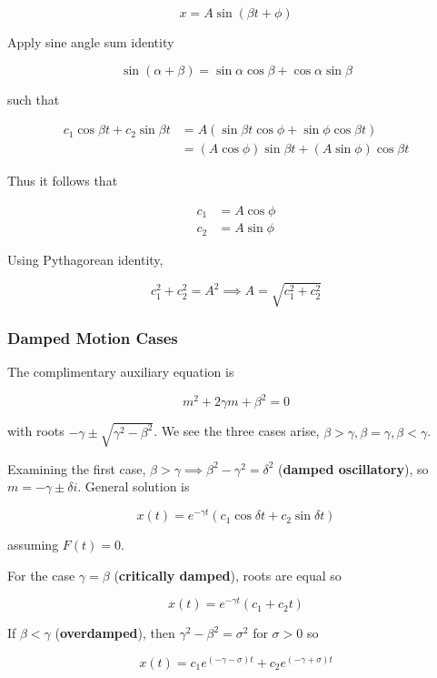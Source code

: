 \begin{equation}
    x=A\sin (\beta t+\phi)
\end{equation}

Apply sine angle sum identity

\begin{equation}
    \sin(\alpha + \beta)=\sin\alpha \cos\beta + \cos\alpha \sin\beta
\end{equation}

such that

\begin{align}
    c_1\cos\beta t + c_2\sin\beta t&=A(\sin\beta t\cos\phi +\sin\phi \cos\beta t)\\
    &=(A\cos\phi)\sin\beta t+(A\sin\phi)\cos\beta t
\end{align}

Thus it follows that

\begin{align}
    c_1&=A\cos\phi\\
    c_2&=A\sin\phi
\end{align}

Using Pythagorean identity,

\begin{equation}
    c_1^2+c_2^2=A^2\implies A=\sqrt{c_1^2+c_2^2}
\end{equation}

\subsubsection{Damped Motion Cases}

The complimentary auxiliary equation is

\begin{equation}
    m^2+2\gamma m+\beta^2=0
\end{equation}

with roots $-\gamma \pm \sqrt{\gamma^2-\beta^2}$. We see the three cases arise,
$\beta > \gamma , \beta=\gamma,\beta <\gamma$.

Examining the first case, $\beta>\gamma\implies \beta^2-\gamma^2=\delta^2$ (\textbf{damped oscillatory}), so
$m=-\gamma \pm \delta i$. General solution is

\begin{equation}
    x(t)=e^{-\gamma t}(c_1\cos\delta t+c_2\sin\delta t)
\end{equation}

assuming $F(t)=0$.

For the case $\gamma = \beta$ (\textbf{critically damped}), roots are equal so

\begin{equation}
    x(t)=e^{-\gamma t}(c_1+c_2t)
\end{equation}

If $\beta<\gamma$ (\textbf{overdamped}), then $\gamma^2-\beta^2=\sigma^2$ for $\sigma>0$ so

\begin{equation}
    x(t)=c_1e^{(-\gamma-\sigma)t}+c_2e^{(-\gamma+\sigma)t}
\end{equation}